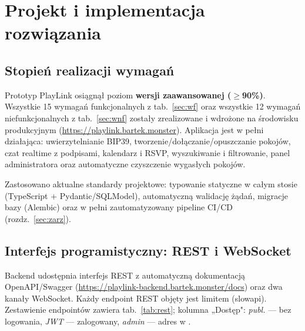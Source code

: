 \section{Projekt i implementacja rozwiązania}
\label{sec:impl}

\subsection{Stopień realizacji wymagań}

Prototyp PlayLink osiągnął poziom \textbf{wersji zaawansowanej ($\geq$90\%)}. Wszystkie
15 wymagań funkcjonalnych z tab.~\ref{sec:wf} oraz wszystkie 12 wymagań niefunkcjonalnych
z tab.~\ref{sec:wnf} zostały zrealizowane i wdrożone na środowisku produkcyjnym
(\url{https://playlink.bartek.monster}). Aplikacja jest w pełni działająca:
uwierzytelnianie BIP39, tworzenie/dołączanie/opuszczanie pokojów, czat realtime z
podpisami, kalendarz i RSVP, wyszukiwanie i filtrowanie, panel administratora oraz
automatyczne czyszczenie wygasłych pokojów.

Zastosowano aktualne standardy projektowe: typowanie statyczne w całym stosie
(TypeScript + Pydantic/SQLModel), automatyczną walidację żądań, migracje bazy
(Alembic) oraz w pełni zautomatyzowany pipeline CI/CD (rozdz.~\ref{sec:zarz}).

\subsection{Interfejs programistyczny: REST i WebSocket}
\label{sec:api}

Backend udostępnia interfejs REST z automatyczną dokumentacją OpenAPI/Swagger
(\url{https://playlink-backend.bartek.monster/docs}) oraz dwa kanały WebSocket. Każdy
endpoint REST objęty jest limitem  (slowapi). Zestawienie endpointów
zawiera tab.~\ref{tab:rest}; kolumna „Dostęp": \emph{publ.} — bez logowania,
\emph{JWT} — zalogowany, \emph{admin} — adres w .

